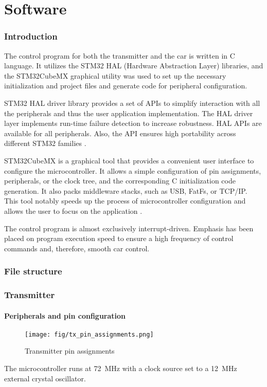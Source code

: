 


\part{Software}
\label{chap:software}
\section{Introduction}
The control program for both the transmitter and the car is written in C language. It utilizes the STM32 HAL (Hardware Abstraction Layer) libraries, and the STM32CubeMX graphical utility was used to set up the necessary initialization and project files and generate code for peripheral configuration.

STM32 HAL driver library provides a set of APIs to simplify interaction with all the peripherals and thus the user application implementation. The HAL driver layer implements run-time failure detection to increase robustness. HAL APIs are available for all peripherals. Also, the API ensures high portability across different STM32 families \cite{hal}.

STM32CubeMX is a graphical tool that provides a convenient user interface to configure the microcontroller. It allows a simple configuration of pin assignments, peripherals, or the clock tree, and the corresponding C initialization code generation. It also packs middleware stacks, such as USB, FatFs, or TCP/IP. This tool notably speeds up the process of microcontroller configuration and allows the user to focus on the application \cite{cubemx}.

The control program is almost exclusively interrupt-driven. Emphasis has been placed on program execution speed to ensure a high frequency of control commands and, therefore, smooth car control.

\section{File structure}
\todo

\section{Transmitter}
\subsection{Peripherals and pin configuration}
\label{sub:tx_conf}
\begin{figure}[t]
\centering
\texttt{[image: fig/tx\_pin\_assignments.png]}
\caption{Transmitter pin assignments}
\label{fig:tx_conf}
\end{figure}
The microcontroller runs at \SI{72}{\MHz} with a clock source set to a \SI{12}{\MHz} external crystal oscillator.

